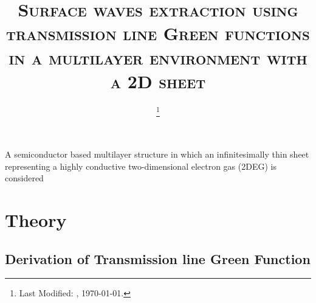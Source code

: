 \documentclass[11pt]{article}
\begin{document}
\title{\textsc{Surface waves extraction using transmission line Green functions in a multilayer environment with a 2D sheet}}

\date{\footnote{Last Modified: \currenttime, \today.}}

\maketitle





A semiconductor based multilayer structure in which an infinitesimally thin sheet representing a highly conductive two-dimensional electron gas (2DEG) is considered

\section{Theory}
\subsection{Derivation of Transmission line Green Function}
\end{document}
